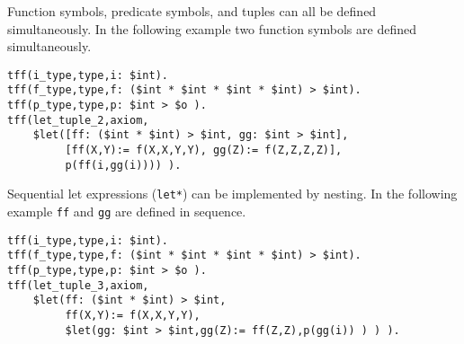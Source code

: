 \documentclass{easychair}
\begin{document}
Function symbols, predicate symbols, and tuples can all be defined simultaneously. In the following example two function symbols are defined simultaneously.
\begin{verbatim}
tff(i_type,type,i: $int).
tff(f_type,type,f: ($int * $int * $int * $int) > $int).
tff(p_type,type,p: $int > $o ).
tff(let_tuple_2,axiom,
    $let([ff: ($int * $int) > $int, gg: $int > $int],
         [ff(X,Y):= f(X,X,Y,Y), gg(Z):= f(Z,Z,Z,Z)],
         p(ff(i,gg(i)))) ).
\end{verbatim}


Sequential let expressions (\verb'let*') can be implemented by nesting. In the following example {\tt ff} and {\tt gg} are defined in sequence.
\begin{verbatim}
tff(i_type,type,i: $int).
tff(f_type,type,f: ($int * $int * $int * $int) > $int).
tff(p_type,type,p: $int > $o ).
tff(let_tuple_3,axiom,
    $let(ff: ($int * $int) > $int,
         ff(X,Y):= f(X,X,Y,Y),
         $let(gg: $int > $int,gg(Z):= ff(Z,Z),p(gg(i)) ) ) ).
\end{verbatim}

\end{document}
